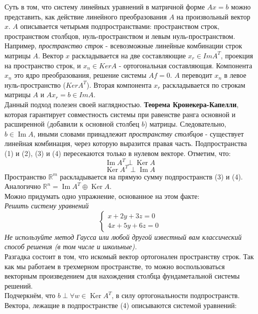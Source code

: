 \documentclass[a4paper,12pt]{article}
\begin{document}
Суть в том, что систему линейных уравнений в матричной форме $Ax = b$ можно представить, как действие линейного преобразования $A$ на произвольный вектор $x$. $A$ описывается четырьмя подпространствами: пространством строк, пространством столбцов, нуль-пространством и левым нуль-пространством. \\
Например, \textit{пространство строк} - всевозможные линейные комбинации строк матрицы $A$. Вектор $x$ раскладывается на две составляющие $x_r \in Im A^T$, проекция на пространство строк, и $x_n \in Ker A$ - ортогональная составляющая. Компонента $x_n$ это ядро преобразования, решение системы $Af =0$. $A$ переводит $x_n$ в левое нуль-пространство ($Ker A^T$). Вторая компонента $x_r$ раскладывается по строкам матрицы $A$ и $Ax_r = b \in Im A$. \\
Данный подход полезен своей наглядностью. \textbf{Теорема Кронекера-Капелли}, которая гарантирует совместность системы при равенстве ранга основной и расширенной (добавили к основной столбец $b$) матрицы. Следовательно, $b \in \operatorname{Im} A$, иными словами принадлежит \textit{пространству столбцов} - существует линейная комбинация, через которую выразится правая часть. Подпространства (1) и (2), (3) и (4) пересекаются только в нулевом векторе. Отметим, что:
\[ \operatorname{Im} A^{T} \perp \operatorname{Ker} A  \]
\[ \operatorname{Ker} A^{T} \perp \operatorname{Im} A \]
Пространство $\mathbb{R}^m$ раскладывается на прямую сумму подпространств (3) и (4). Аналогично $\mathbb{R}^n = \operatorname{Im} A^{T} \oplus \operatorname{Ker} A$. \\
Можно придумать одно упражнение, основанное на этом факте: \\
\textit{
Решить систему уравнений 
\begin{equation*}
 \begin{cases}
   x + 2y + 3z = 0\\
   4x + 5y + 6z = 0
 \end{cases}
\end{equation*}
Не используйте метод Гаусса или любой другой известный вам классический способ решения (в том числе и школьные). } \\
Разгадка состоит в том, что искомый вектор ортогонален пространству строк. Так как мы работаем в трехмерном пространстве, то можно воспользоваться векторным произведением для нахождения столбца фундаметальной системы решений. \\
Подчеркнём, что $b \perp \forall w \in  \operatorname{Ker} A^{T}$, в силу ортогональности подпространств. Вектора, лежащие в подпространстве (4) описываются системой уравнений:
\end{document}
